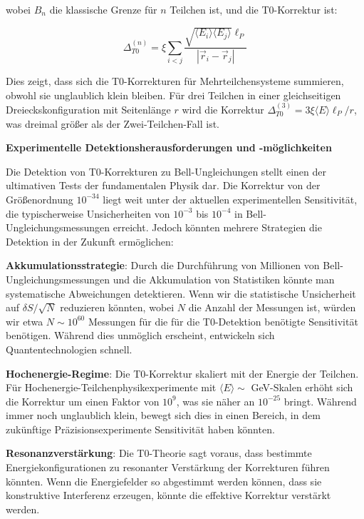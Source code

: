 \documentclass[12pt,a4paper]{article}
\newcommand{\xipar}{\xi}
\theoremstyle{definition}
\theoremstyle{remark}
\begin{document}
wobei $B_n$ die klassische Grenze f{\"u}r $n$ Teilchen ist, und die T0-Korrektur ist:

\begin{equation}
	\Delta_{T0}^{(n)} = \xipar \sum_{i<j} \frac{\sqrt{\langle E_i \rangle \langle E_j \rangle} \ell_P}{|\vec{r}_i - \vec{r}_j|}
	\label{eq:extended_t0_correction}
\end{equation}

Dies zeigt, dass sich die T0-Korrekturen f{\"u}r Mehrteilchensysteme summieren, obwohl sie unglaublich klein bleiben. F{\"u}r drei Teilchen in einer gleichseitigen Dreieckskonfiguration mit Seitenl{\"a}nge $r$ wird die Korrektur $\Delta_{T0}^{(3)} = 3\xipar \langle E \rangle \ell_P / r$, was dreimal gr{\"o}{\ss}er als der Zwei-Teilchen-Fall ist.

\textbf{Experimentelle Detektionsherausforderungen und -m{\"o}glichkeiten}

Die Detektion von T0-Korrekturen zu Bell-Ungleichungen stellt einen der ultimativen Tests der fundamentalen Physik dar. Die Korrektur von der Gr{\"o}{\ss}enordnung $10^{-34}$ liegt weit unter der aktuellen experimentellen Sensitivit{\"a}t, die typischerweise Unsicherheiten von $10^{-3}$ bis $10^{-4}$ in Bell-Ungleichungsmessungen erreicht. Jedoch k{\"o}nnten mehrere Strategien die Detektion in der Zukunft erm{\"o}glichen:

\textbf{Akkumulationsstrategie}: Durch die Durchf{\"u}hrung von Millionen von Bell-Ungleichungsmessungen und die Akkumulation von Statistiken k{\"o}nnte man systematische Abweichungen detektieren. Wenn wir die statistische Unsicherheit auf $\delta S / \sqrt{N}$ reduzieren k{\"o}nnten, wobei $N$ die Anzahl der Messungen ist, w{\"u}rden wir etwa $N \sim 10^{60}$ Messungen f{\"u}r die f{\"u}r die T0-Detektion ben{\"o}tigte Sensitivit{\"a}t ben{\"o}tigen. W{\"a}hrend dies unm{\"o}glich erscheint, entwickeln sich Quantentechnologien schnell.

\textbf{Hochenergie-Regime}: Die T0-Korrektur skaliert mit der Energie der Teilchen. F{\"u}r Hochenergie-Teilchenphysikexperimente mit $\langle E \rangle \sim$ GeV-Skalen erh{\"o}ht sich die Korrektur um einen Faktor von $10^9$, was sie n{\"a}her an $10^{-25}$ bringt. W{\"a}hrend immer noch unglaublich klein, bewegt sich dies in einen Bereich, in dem zuk{\"u}nftige Pr{\"a}zisionsexperimente Sensitivit{\"a}t haben k{\"o}nnten.

\textbf{Resonanzverst{\"a}rkung}: Die T0-Theorie sagt voraus, dass bestimmte Energiekonfigurationen zu resonanter Verst{\"a}rkung der Korrekturen f{\"u}hren k{\"o}nnten. Wenn die Energiefelder so abgestimmt werden k{\"o}nnen, dass sie konstruktive Interferenz erzeugen, k{\"o}nnte die effektive Korrektur verst{\"a}rkt werden.
\end{document}
